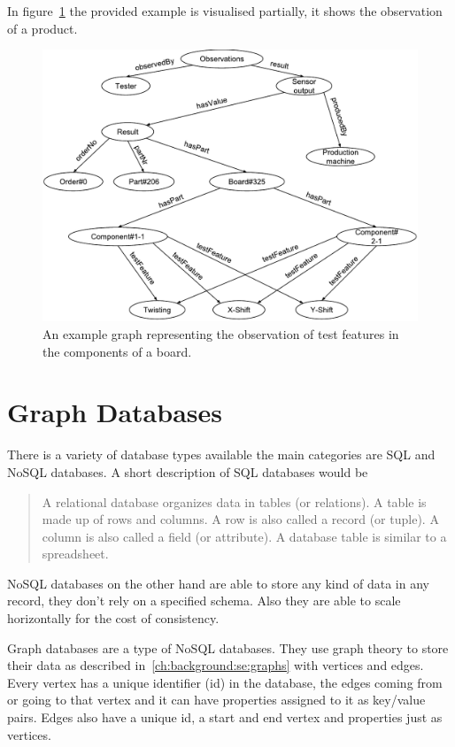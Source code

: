 In figure~\ref{fig:exampleData} the provided example is visualised partially,
it shows the observation of a product.

\begin{figure}
  \centering
  \includegraphics[width=\textwidth]{images/exampleGraph}
  \caption{An example graph representing the observation of test features in the components of a board.}
  \label{fig:exampleData}
\end{figure}

\section{Graph Databases}
\label{ch:background:se:graphDatabases}
There is a variety of database types available the main categories are SQL and NoSQL databases.
A short description of SQL databases would be
\blockquote[\cite{ChuaHock-Chuan}]{A relational database organizes data in tables (or relations).
A table is made up of rows and columns.
A row is also called a record (or tuple).
A column is also called a field (or attribute).
A database table is similar to a spreadsheet.}

NoSQL databases on the other hand are able to store any kind of data in any record,
they don't rely on a specified schema.
Also they are able to scale horizontally for the cost of consistency.~\cite{Yegulalp2017}

Graph databases are a type of NoSQL databases.
They use graph theory to store their data as described in~\ref{ch:background:se:graphs} with vertices and edges.
Every vertex has a unique identifier (id) in the database,
the edges coming from or going to that vertex and it can have properties assigned to it as key/value pairs.
Edges also have a unique id,
a start and end vertex and properties just as vertices.~\cite{Rouse2016}

